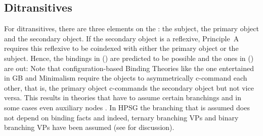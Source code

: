 \documentclass[output=paper
 	        ,biblatex
                ,babelshorthands
                ,newtxmath
                ,draftmode
                ,colorlinks, citecolor=brown
]{langscibook}
\begin{document}
\subsection{Ditransitives}

For ditransitives, there are three elements on the \argstl: the subject, the primary object and the
secondary object. If the secondary object is a reflexive, Principle~A requires this reflexive to be
coindexed with either the primary object or the subject. Hence, the bindings in () are
predicted to be possible and the ones in () are out:
\eal
{}
\zl
\eal
{}
\zl
Note that configuration-based Binding Theories like the one entertained in GB and Minimalism require
the objects to asymmetrically c-command each other, that is, the primary object c-commands the secondary object but
not vice versa. This results in theories that have to assume certain branchings and in some cases
even auxiliary nodes \citep[Section~4.4]{Adger2003a}. In HPSG the branching that is assumed does not depend on binding facts and
indeed, ternary branching VPs \citep[]{ps2} and binary branching VPs have been assumed (see
 for discussion).
\end{document}
